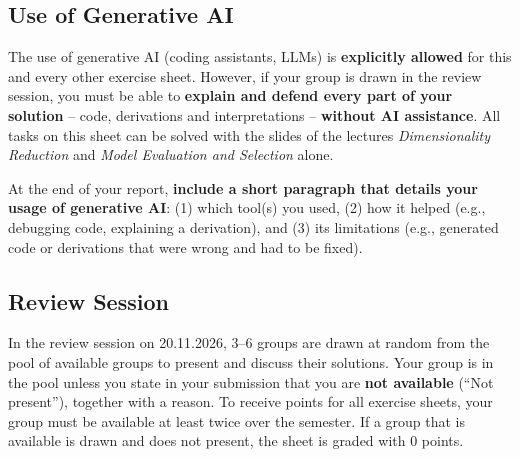 \documentclass[hidelinks,10pt]{article}
\begin{document}
\subsection*{Use of Generative AI}
The use of generative AI (coding assistants, LLMs) is \textbf{explicitly allowed} for this and every other exercise sheet. However, if your group is drawn in the review session, you must be able to \textbf{explain and defend every part of your solution} -- code, derivations and interpretations -- \textbf{without AI assistance}. All tasks on this sheet can be solved with the slides of the lectures \emph{Dimensionality Reduction} and \emph{Model Evaluation and Selection} alone.

At the end of your report, \textbf{include a short paragraph that details your usage of generative AI}: (1) which tool(s) you used, (2) how it helped (e.g., debugging code, explaining a derivation), and (3) its limitations (e.g., generated code or derivations that were wrong and had to be fixed).

\subsection*{Review Session}
In the review session on 20.11.2026, 3--6 groups are drawn at random from the pool of available groups to present and discuss their solutions. Your group is in the pool unless you state in your submission that you are \textbf{not available} (``Not present''), together with a reason. To receive points for all exercise sheets, your group must be available at least twice over the semester. If a group that is available is drawn and does not present, the sheet is graded with 0 points.

\endgroup

\pagebreak

\end{document}
